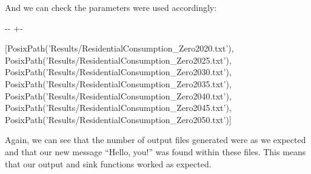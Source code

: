 \documentclass[letterpaper,10pt,english]{sphinxmanual}
\newlength\nbsphinxcodecellspacing
\begin{document}
And we can check the parameters were used accordingly:

{
\begin{sphinxVerbatim}[commandchars=\\\{\}]
\llap{\color{nbsphinxin}[9]:\,\hspace{\fboxrule}\hspace{\fboxsep}}    
   
   \PYG{p}{[}\PYG{p}{]}
\end{sphinxVerbatim}
}

{

\kern-\sphinxverbatimsmallskipamount\kern-\baselineskip
\kern+\FrameHeightAdjust\kern-\fboxrule
\vspace{\nbsphinxcodecellspacing}

\begin{sphinxVerbatim}[commandchars=\\\{\}]
\llap{\color{nbsphinxout}[9]:\,\hspace{\fboxrule}\hspace{\fboxsep}}[PosixPath('Results/ResidentialConsumption\_Zero2020.txt'),
 PosixPath('Results/ResidentialConsumption\_Zero2025.txt'),
 PosixPath('Results/ResidentialConsumption\_Zero2030.txt'),
 PosixPath('Results/ResidentialConsumption\_Zero2035.txt'),
 PosixPath('Results/ResidentialConsumption\_Zero2040.txt'),
 PosixPath('Results/ResidentialConsumption\_Zero2045.txt'),
 PosixPath('Results/ResidentialConsumption\_Zero2050.txt')]
\end{sphinxVerbatim}
}

Again, we can see that the number of output files generated were as we expected and that our new message “Hello, you!” was found within these files. This means that our output and sink functions worked as expected.
\end{document}
